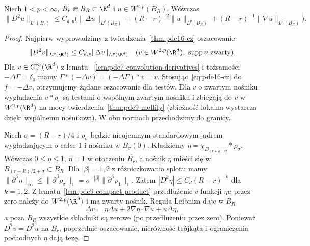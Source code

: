 \begin{lemat}
\label{lem:pde16-localization}
Niech $1<p<\infty$, $B_r\Subset B_R\subset\R^d$ i
$u\in W^{2,p}(B_R)$. Wówczas
\[
 \|D^2u\|_{L^p(B_r)}\le C_{d,p}\bigl(
 \|\Delta u\|_{L^p(B_R)}+
 (R-r)^{-2}\|u\|_{L^p(B_R)}+
 (R-r)^{-1}\|\nabla u\|_{L^p(B_R)}\bigr).
\]
\end{lemat}
\begin{proof}
Najpierw wyprowadzimy z twierdzenia~\ref{thm:pde16-cz}
oszacowanie
\[
 \|D^2v\|_{L^p(\R^d)}\le C_{d,p}\|\Delta v\|_{L^p(\R^d)}
 \quad(v\in W^{2,p}(\R^d),\ \operatorname{supp}v
 \text{ zwarty}).
\]
Dla $v\in C_c^\infty(\R^d)$ z lematu
~\ref{lem:pde7-convolution-derivatives} i tożsamości
$-\Delta\Gamma=\delta_0$ mamy
$\Gamma*(-\Delta v)=(-\Delta\Gamma)*v=v$.
Stosując~\eqref{eq:pde16-cz} do $f=-\Delta v$,
otrzymujemy żądane oszacowanie dla testów.
Dla $v$ o zwartym nośniku wygładzenia
$v*\rho_\varepsilon$ są testami o wspólnym zwartym
nośniku i zbiegają do $v$ w $W^{2,p}(\R^d)$
na mocy twierdzenia~\ref{thm:pde9-mollify}
(zbieżność lokalna wystarcza dzięki wspólnemu nośnikowi).
W obu normach przechodzimy do granicy.

Niech $\sigma=(R-r)/4$ i $\rho_\sigma$ będzie
nieujemnym standardowym jądrem wygładzającym
o całce $1$ i nośniku w $B_\sigma(0)$.
Kładziemy $\eta=\chi_{B_{(r+R)/2}}*\rho_\sigma$.
Wówczas $0\le\eta\le1$, $\eta=1$ w otoczeniu
$\overline{B_r}$, a nośnik $\eta$ mieści się
w $\overline{B_{(r+R)/2+\sigma}}\subset B_R$.
Dla $|\beta|=1,2$ z różniczkowania splotu mamy
$\|\partial^\beta\eta\|_\infty\le
\|\partial^\beta\rho_\sigma\|_1
=\sigma^{-|\beta|}\|\partial^\beta\rho_1\|_1$.
Zatem $|D^k\eta|\le C_d(R-r)^{-k}$ dla $k=1,2$.
Z lematu~\ref{lem:pde9-compact-product} przedłużenie
$v$ funkcji $\eta u$ przez zero należy do
$W^{2,p}(\R^d)$ i ma zwarty nośnik. Reguła Leibniza
daje w $B_R$
\[
 \Delta v=\eta\Delta u+2\nabla\eta\cdot\nabla u+u\Delta\eta,
\]
a poza $B_R$ wszystkie składniki są zerowe
(po przedłużeniu przez zero).
Ponieważ $D^2v=D^2u$ na $B_r$, poprzednie oszacowanie,
nierówność trójkąta i ograniczenia pochodnych $\eta$
dają tezę.
\end{proof}

